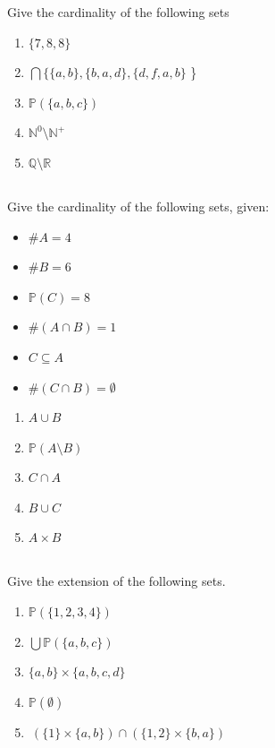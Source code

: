 \documentclass[twocolumn]{article}
\begin{document}
    Give the cardinality of the following sets

    \begin{enumerate}
        \item $\{ 7, 8, 8\}$
        \item $\bigcap \{ \{ a, b \}, \{ b, a, d\}, \{d, f, a, b \}$ \}
        \item $\mathbb{P}(\{ a, b, c\})$
        \item $\mathbb{N}^0 \setminus \mathbb{N}^+$
        \item $\mathbb{Q} \setminus \mathbb{R}$
    \end{enumerate}

\subsection{}

    Give the cardinality of the following sets, given:

\begin{multicols}{2}
    \begin{itemize}
        \item $\#A = 4$
        \item $\#B = 6$
        \item $\mathbb{P}(C) = 8$
        \item $\#(A \cap B) = 1$
        \item $ C \subseteq A $
        \item $ \# (C \cap B) = \emptyset$
    \end{itemize}
\end{multicols}

    \begin{enumerate}
        \item $ A \cup B $
        \item $ \mathbb{P}(A \setminus B)$
        \item $ C \cap A $
        \item $ B \cup C $
        \item $ A \times B $
    \end{enumerate}

    \subsection{}

    Give the extension of the following sets.

    \begin{enumerate}
        \item $\mathbb{P}(\{ 1, 2, 3, 4 \})$
        \item $ \bigcup  \mathbb{P}(\{a, b, c\})  $
        \item $ \{a, b\} \times \{ a, b, c, d \} $
        \item $ \mathbb{P} ( \emptyset ) $
        \item $ \ ( \{ 1 \} \times \{ a, b \} ) \cap ( \{ 1, 2 \} \times \{ b, a \} ) $
    \end{enumerate}
\end{document}
